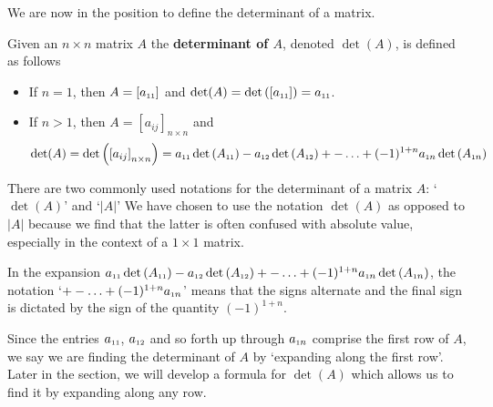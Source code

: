 \documentclass{ximera}
\begin{document}
We are now in the position to define the determinant of a matrix.

\smallskip


\begin{definition} \label{determinantdefn}   Given an $n \times n$ matrix $A$ the \textbf{determinant of \boldmath $A$}, denoted $\det(A)$, is defined as follows

\begin{itemize}

\item  If $n=1$, then $A = \left[ a_{\mbox{\tiny$11$}} \right]$ and $\det(A) = \det\left( \left[ a_{\mbox{\tiny$11$}} \right] \right) = a_{\mbox{\tiny$11$}}$.

\item  If $n>1$, then $A = \left[ a_{ij} \right]_{n \times n}$ and \[ \det(A) = \det\left( \left[ a_{ij} \right]_{n \times n} \right) =  a_{\mbox{\tiny$11$}} \det\left(A_{\mbox{\tiny$11$}}\right)- a_{\mbox{\tiny$12$}} \det\left(A_{\mbox{\tiny$12$}}\right) + -  \ldots  + (-1)^{1+n} a_{\mbox{\tiny$1$}n} \det\left(A_{\mbox{\tiny$1$}n}\right)\]

\end{itemize}

\end{definition}

\smallskip

There are two commonly used notations for the determinant of a matrix $A$: `$\det(A)$' and `$|A|$'
We have chosen to use the notation $\det(A)$ as opposed to $|A|$ because we find that the latter is often confused with absolute value, especially in the context of a $1 \times 1$ matrix.  

In the expansion $a_{\mbox{\tiny$11$}} \det\left(A_{\mbox{\tiny$11$}}\right)- a_{\mbox{\tiny$12$}} \det\left(A_{\mbox{\tiny$12$}}\right) + -  \ldots  + (-1)^{1+n} a_{\mbox{\tiny$1$}n} \det\left(A_{\mbox{\tiny$1$}n}\right)$, the notation `$+ -  \ldots  + (-1)^{1+n} a_{\mbox{\tiny$1$}n}$' means that the signs alternate and the final sign is dictated by the sign of the quantity $(-1)^{1+n}$. 

Since the entries $a_{\mbox{\tiny$11$}}$, $a_{\mbox{\tiny$12$}}$ and so forth up through $a_{\mbox{\tiny$1$}n}$ comprise the first row of $A$, we say we are finding the determinant of $A$  by `expanding along the first row'. Later in the section, we will develop a formula for $\det(A)$ which allows us to find it by expanding along any row.
\end{document}

